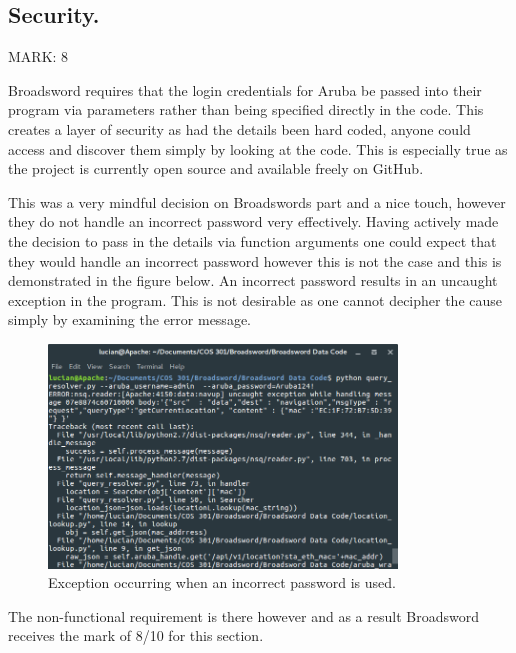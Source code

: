 \documentclass{article}
\begin{document}
\newpage
\subsection{Security.}
\begin{flushleft}
MARK: 8
\end{flushleft}

\begin{flushleft}
Broadsword requires that the login credentials for Aruba be passed into their program via parameters rather than being specified directly in the code. This creates a layer of security as had the details been hard coded, anyone could access and discover them simply by looking at the code. This is especially true as the project is currently open source and available freely on GitHub.
\end{flushleft}

\begin{flushleft}
This was a very mindful decision on Broadswords part and a nice touch, however they do not handle an incorrect password very effectively. Having actively made the decision to pass in the details via function arguments one could expect that they would handle an incorrect password however this is not the case and this is demonstrated in the figure below. An incorrect password results in an uncaught exception in the program. This is not desirable as one cannot decipher the cause simply by examining the error message.
\end{flushleft}

\begin{figure}[ht]
  \includegraphics[width=350px]{Images/Incorrect_Password.png}
  \caption{Exception occurring when an incorrect password is used.}
  \label{Terminal output.}  
\end{figure}

\begin{flushleft}
The non-functional requirement is there however and as a result Broadsword receives the mark of 8/10 for this section.
\end{flushleft}
\end{document}
